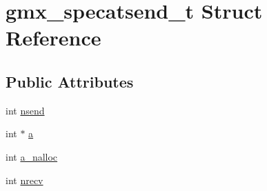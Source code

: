 \hypertarget{structgmx__specatsend__t}{\section{gmx\-\_\-specatsend\-\_\-t \-Struct \-Reference}
\label{structgmx__specatsend__t}
}
\subsection*{\-Public \-Attributes}
\begin{DoxyCompactItemize}
\item 
int \hyperlink{structgmx__specatsend__t_a7f2f4145ab0c2f668df0b9efe7bc57b2}{nsend}
\item 
int $\ast$ \hyperlink{structgmx__specatsend__t_a54bcb81cb6a8cd0d3353f57f0ffc6252}{a}
\item 
int \hyperlink{structgmx__specatsend__t_ad04b693f9d38d435435600ed1a99aec2}{a\-\_\-nalloc}
\item 
int \hyperlink{structgmx__specatsend__t_a70f7904d11ecac3d762a76b21e31024c}{nrecv}
\end{DoxyCompactItemize}


